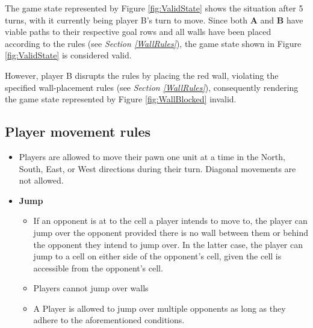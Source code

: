 The game state represented by Figure \ref{fig:ValidState} shows the situation after 5 turns, with it currently
being player B's turn to move. Since both \textbf{A} and \textbf{B} have viable paths to their respective goal
rows and all walls have been placed according to the rules (see \textit{Section \ref{WallRules}}),
the game state shown in Figure \ref{fig:ValidState} is considered valid.
\par
However, player B disrupts the rules by placing the red wall, violating the specified wall-placement rules
(see \textit{Section \ref{WallRules}}), consequently rendering the game state represented by
Figure \ref{fig:WallBlocked} invalid.

\pagebreak

\subsection{Player movement rules}

\begin{itemize}
    \item Players are allowed to move their pawn one unit at a time in the North, South, East, or West
        directions during their turn. Diagonal movements are not allowed.

    \item \textbf{Jump}
    \begin{itemize}
        \item If an opponent is at to the cell a player intends to move to, the player can jump over the
            opponent provided there is no wall between them or behind the opponent they intend to jump over.
            In the latter case, the player can jump to a cell on either side of the opponent's cell, given
            the cell is accessible from the opponent's cell.
        \item Players cannot jump over walls
        \item A Player is allowed to jump over multiple opponents as long as they adhere to the aforementioned
            conditions.
    \end{itemize}
\end{itemize}

